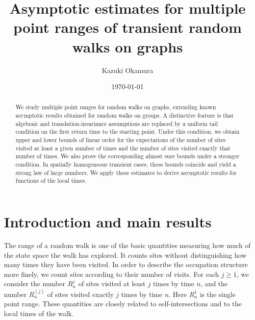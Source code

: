 \documentclass[a4paper, reqno, 11pt]{amsart}
\theoremstyle{definition}
\begin{document}
\title[multiple point ranges on graphs]{Asymptotic estimates for multiple point ranges of transient random walks on graphs}
\author{Kazuki Okamura}
\date{\today}
\address{Department of Mathematics, Faculty of Science, Shizuoka University, 836, Ohya, Suruga-ku, Shizuoka, 422-8529, JAPAN.}
\subjclass[2020]{}
\maketitle

\begin{abstract}
We study multiple point ranges for random walks on graphs, extending known asymptotic results obtained for random walks on groups.
A distinctive feature is that algebraic and translation-invariance assumptions are replaced by a uniform tail condition on the first return time to the starting point. 
Under this condition, we obtain upper and lower bounds of linear order for the expectations of the number of sites visited at least a given number of times and the number of sites visited exactly that number of times. 
We also prove the corresponding almost sure bounds under a stronger condition.  
In spatially homogeneous transient cases, these bounds coincide and yield a strong law of large numbers.
We apply these estimates to derive asymptotic results for functions of the local times.
\end{abstract}

\section{Introduction and main results}

The range of a random walk is one of the basic quantities measuring how much of the state space the walk has explored. 
It counts sites without distinguishing how many times they have been visited. 
In order to describe the occupation structure more finely, we count sites according to their number of visits. 
For each $j \ge 1$, we consider the number $R_n^j$ of sites visited at least $j$ times by time $n$, and the number $R_n^{(j)}$ of sites visited exactly $j$ times by time $n$. 
Here $R_n^{1}$ is the single point range. 
These quantities are closely related to self-intersections and to the local times of the walk.
\end{document}

